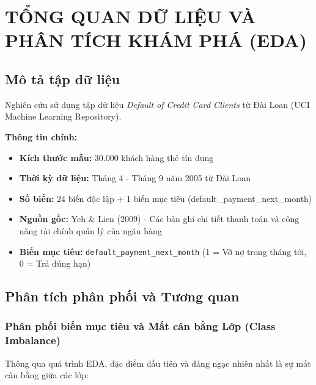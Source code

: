 

\chapter{TỔNG QUAN DỮ LIỆU VÀ PHÂN TÍCH KHÁM PHÁ (EDA)}

\section{Mô tả tập dữ liệu}

Nghiên cứu sử dụng tập dữ liệu \textit{Default of Credit Card Clients} từ Đài Loan (UCI Machine Learning Repository). 

\textbf{Thông tin chính:}
\begin{itemize}
    \item \textbf{Kích thước mẫu:} 30.000 khách hàng thẻ tín dụng
    \item \textbf{Thời kỳ dữ liệu:} Tháng 4 - Tháng 9 năm 2005 từ Đài Loan
    \item \textbf{Số biến:} 24 biến độc lập + 1 biến mục tiêu (default\_payment\_next\_month)
    \item \textbf{Nguồn gốc:} Yeh \& Lien (2009) - Các bản ghi chi tiết thanh toán và công năng tài chính quản lý của ngân hàng
    \item \textbf{Biến mục tiêu:} \texttt{default\_payment\_next\_month} (1 = Vỡ nợ trong tháng tới, 0 = Trả đúng hạn)
\end{itemize}

\section{Phân tích phân phối và Tương quan}

\subsection{Phân phối biến mục tiêu và Mất cân bằng Lớp (Class Imbalance)}

Thông qua quá trình EDA, đặc điểm đầu tiên và đáng ngạc nhiên nhất là sự mất cân bằng
giữa các lớp:

